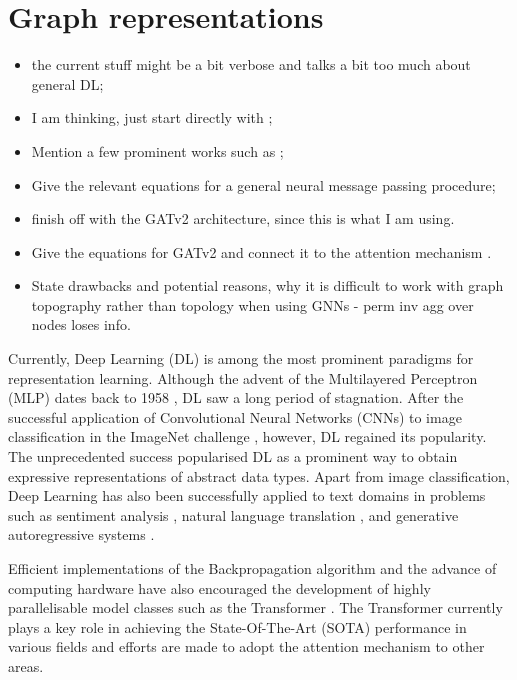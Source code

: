 \documentclass{report}
\numberwithin{equation}{section}
\numberwithin{figure}{section}
\numberwithin{table}{section}
\numberwithin{algorithm}{section}
\begin{document}
\chapter{Graph representations}\label{chap:GNNs}
\begin{itemize}
  \item the current stuff might be a bit verbose and talks 
  a bit too much about general DL; 
  \item I am thinking, just start directly with \cite{ScarselliGNN};
  \item Mention a few prominent works such as \cite{MPNNs,GCN};
  \item Give the relevant equations for a general neural message 
  passing procedure;
  \item finish off with the GATv2 \citep{GATv2} architecture, 
  since this is what I am using.
  \item Give the equations for GATv2 and connect it to the 
  attention mechanism \citep{transformers}.
  \item State drawbacks and potential reasons, why it is difficult 
    to work with graph topography rather than topology when using 
    GNNs - perm inv agg over nodes loses info.
\end{itemize}
Currently, Deep Learning (DL) is among the most prominent paradigms 
for representation learning. Although the advent of the 
Multilayered Perceptron (MLP) dates back to 
1958 \citep{perceptron}, DL saw a long period 
of stagnation. After the successful application of 
Convolutional Neural 
Networks (CNNs) \citep{CNNsLecun} to image classification
in the ImageNet challenge 
\citep{alexnet,imagenet}, however, DL regained 
its popularity. The unprecedented success 
popularised DL as a prominent way 
to obtain expressive representations of abstract data types. 
Apart from image classification, 
Deep Learning has also been successfully 
applied to text domains in problems such as 
sentiment analysis \citep{SentimentRNN,textCNN,BERT},  
natural language translation \citep{nlpTranslation},
and generative autoregressive systems \citep{GPT,GPT2020}.

Efficient implementations \citep{PyTorch,tensorflow} 
of the Backpropagation algorithm \citep{backprop} and the 
advance of computing 
hardware have also encouraged the development of highly parallelisable 
model classes such as the Transformer \citep{transformers}. The 
Transformer currently plays a key role in achieving the 
State-Of-The-Art (SOTA) performance 
in various fields and efforts are made to adopt the attention 
mechanism to other areas.
\end{document}
